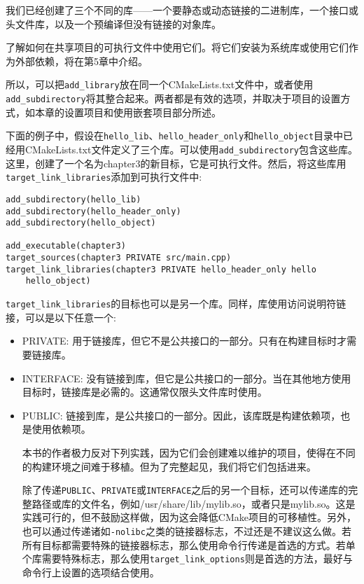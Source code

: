 我们已经创建了三个不同的库——一个要静态或动态链接的二进制库，一个接口或头文件库，以及一个预编译但没有链接的对象库。

了解如何在共享项目的可执行文件中使用它们。将它们安装为系统库或使用它们作为外部依赖，将在第5章中介绍。

所以，可以把\texttt{add\_library}放在同一个CMakeLists.txt文件中，或者使用\texttt{add\_subdirectory}将其整合起来。两者都是有效的选项，并取决于项目的设置方式，如本章的设置项目和使用嵌套项目部分所述。

下面的例子中，假设在\texttt{hello\_lib}、\texttt{hello\_header\_only}和\texttt{hello\_object}目录中已经用CMakeLists.txt文件定义了三个库。可以使用\texttt{add\_subdirectory}包含这些库。这里，创建了一个名为chapter3的新目标，它是可执行文件。然后，将这些库用\texttt{target\_link\_libraries}添加到可执行文件中:

\begin{lstlisting}[style=styleCMake]
add_subdirectory(hello_lib)
add_subdirectory(hello_header_only)
add_subdirectory(hello_object)

add_executable(chapter3)
target_sources(chapter3 PRIVATE src/main.cpp)
target_link_libraries(chapter3 PRIVATE hello_header_only hello
	hello_object)
\end{lstlisting}

\texttt{target\_link\_libraries}的目标也可以是另一个库。同样，库使用访问说明符链接，可以是以下任意一个:

\begin{itemize}
\item 
PRIVATE: 用于链接库，但它不是公共接口的一部分。只有在构建目标时才需要链接库。

\item 
INTERFACE: 没有链接到库，但它是公共接口的一部分。当在其他地方使用目标时，链接库是必需的。这通常仅限头文件库时使用。

\item 
PUBLIC: 链接到库，是公共接口的一部分。因此，该库既是构建依赖项，也是使用依赖项。

\begin{tcolorbox}[colback=blue!5!white,colframe=blue!75!black,title=注意——不推荐的做法]
本书的作者极力反对下列实践，因为它们会创建难以维护的项目，使得在不同的构建环境之间难于移植。但为了完整起见，我们将它们包括进来。

除了传递\texttt{PUBLIC}、\texttt{PRIVATE}或\texttt{INTERFACE}之后的另一个目标，还可以传递库的完整路径或库的文件名，例如/usr/share/lib/mylib.so，或者只是mylib.so。这是实践可行的，但不鼓励这样做，因为这会降低CMake项目的可移植性。另外，也可以通过传递诸如\texttt{-nolibc}之类的链接器标志，不过还是不建议这么做。若所有目标都需要特殊的链接器标志，那么使用命令行传递是首选的方式。若单个库需要特殊标志，那么使用\texttt{target\_link\_options}则是首选的方法，最好与命令行上设置的选项结合使用。
\end{tcolorbox}
\end{itemize}

